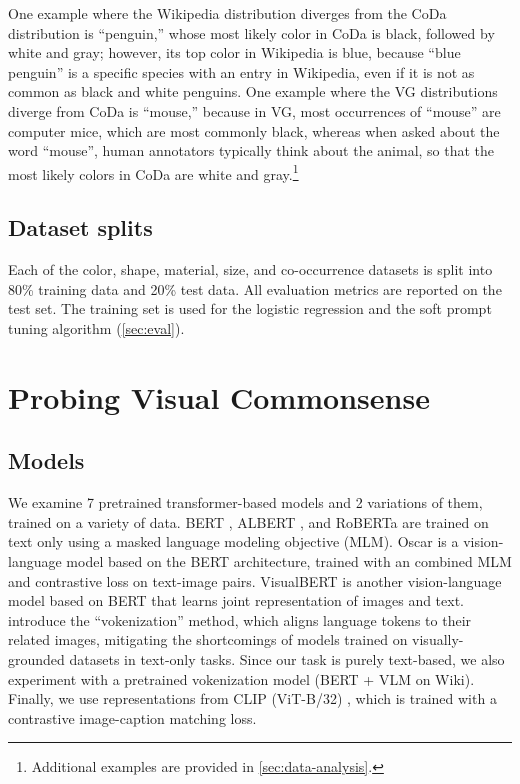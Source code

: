 \documentclass[11pt]{article}
\begin{document}
One example where the Wikipedia distribution diverges from the CoDa distribution is ``penguin,'' whose most likely color in CoDa is black, followed by white and gray; however, its top color in Wikipedia is blue, because ``blue penguin'' is a specific species with an entry in Wikipedia, even if it is not as common as black and white penguins. One example where the VG distributions diverge from CoDa is ``mouse,'' because in VG, most occurrences of ``mouse'' are computer mice, which are most commonly black, whereas when asked about the word ``mouse'', human annotators typically think about the animal, so that the most likely colors in CoDa are white and gray.\footnote{Additional examples are provided in \cref{sec:data-analysis}.}

\subsection{Dataset splits}
Each of the color, shape, material, size, and co-occurrence datasets is split into 80\% training data and 20\% test data. All evaluation metrics are reported on the test set. The training set is used for the logistic regression and the soft prompt tuning algorithm (\cref{sec:eval}).

\section{Probing Visual Commonsense}

\subsection{Models} \label{models}

We examine 7 pretrained transformer-based models and 2 variations of them, trained on a variety of data. BERT \citep{devlin-etal-2019-bert}, ALBERT \citep{lan2020albert}, and RoBERTa \citep{liu2019roberta} are trained on text only using a masked language modeling objective (MLM). 
Oscar \citep{li2020oscar} is a vision-language model based on the BERT architecture, trained with an combined MLM and contrastive loss on text-image pairs. 
VisualBERT \citep{li2019visualbert} is another vision-language model based on BERT that learns joint representation of images and text.
\citet{tan-bansal-2020-vokenization} introduce the ``vokenization'' method, which aligns language tokens to their related images, mitigating the shortcomings of models trained on visually-grounded datasets in text-only tasks. Since our task is purely text-based, we also experiment with a pretrained vokenization model (BERT + VLM on Wiki).
Finally, we use representations from CLIP (ViT-B/32) \citep{clip}, which is trained with a contrastive image-caption matching loss.
\end{document}
